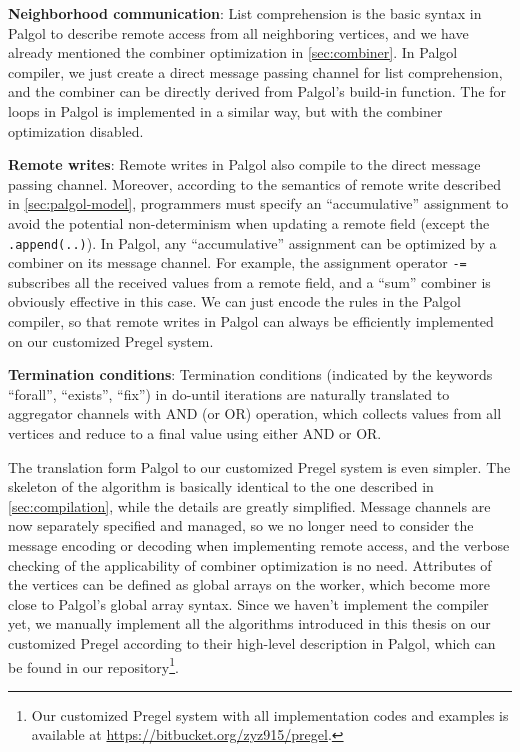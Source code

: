\documentclass{sokendai_thesis} %
\begin{document}
\textbf{Neighborhood communication}: List comprehension is the basic syntax in Palgol to describe remote access from all neighboring vertices, and we have already mentioned the combiner optimization in \autoref{sec:combiner}.
In Palgol compiler, we just create a direct message passing channel for list comprehension, and the combiner can be directly derived from Palgol's build-in function.
The for loops in Palgol is implemented in a similar way, but with the combiner optimization disabled.

\textbf{Remote writes}: Remote writes in Palgol also compile to the direct message passing channel.
Moreover, according to the semantics of remote write described in \autoref{sec:palgol-model}, programmers must specify an ``accumulative'' assignment to avoid the potential non-determinism when updating a remote field (except the \texttt{.append(..)}).
In Palgol, any ``accumulative'' assignment can be optimized by a combiner on its message channel.
For example, the assignment operator \texttt{-=} subscribes all the received values from a remote field, and a ``sum'' combiner is obviously effective in this case.
We can just encode the rules in the Palgol compiler, so that remote writes in Palgol can always be efficiently implemented on our customized Pregel system.

\textbf{Termination conditions}: Termination conditions (indicated by the keywords ``forall'', ``exists'', ``fix'') in do-until iterations are naturally translated to aggregator channels with AND (or OR) operation, which collects values from all vertices and reduce to a final value using either AND or OR.

The translation form Palgol to our customized Pregel system is even simpler.
The skeleton of the algorithm is basically identical to the one described in \autoref{sec:compilation}, while the details are greatly simplified.
Message channels are now separately specified and managed, so we no longer need to consider the message encoding or decoding when implementing remote access, and the verbose checking of the applicability of combiner optimization is no need.
Attributes of the vertices can be defined as global arrays on the worker, which become more close to Palgol's global array syntax.
Since we haven't implement the compiler yet, we manually implement all the algorithms introduced in this thesis on our customized Pregel according to their high-level description in Palgol, which can be found in our repository\footnote{Our customized Pregel system with all implementation codes and examples is available at \url{https://bitbucket.org/zyz915/pregel}.}.
\end{document}

